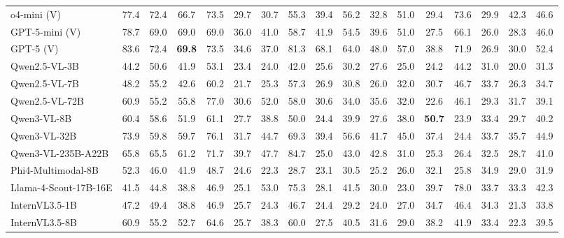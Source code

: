 \documentclass{article}
\theoremstyle{plain}
\theoremstyle{definition}
\theoremstyle{remark}
\theoremstyle{plain}
\begin{document}
\begin{table}[t]
{\begin{tabular}{l|cccc|ccccccc|cc|cc|c}
\midrule
\rowcolor{gray!20} \multicolumn{17}{c}{\textit{Visual Time Series as Input}} \\\midrule
\rowcolor{blue!10}
o4-mini (V) & 77.4 & 72.4 & 66.7 & 73.5 & 29.7 & 30.7 & 55.3 & 39.4 & 56.2 & 32.8 & 51.0 & 29.4 & 73.6 & 29.9 & 42.3 & 46.6 \\
\rowcolor{blue!10}
GPT-5-mini (V) & 78.7 & 69.0 & 69.0 & 69.0 & 36.0 & 41.0 & 58.7 & 41.9 & 54.5 & 39.6 & 51.0 & 27.5 & 66.1 & 26.0 & 28.3 & 46.0 \\
\rowcolor{blue!10}
GPT-5 (V) & 83.6 & 72.4 & \textbf{69.8} & 73.5 & 34.6 & 37.0 & 81.3 & 68.1 & 64.0 & 48.0 & 57.0 & 38.8 & 71.9 & 26.9 & 30.0 & 52.4 \\
\rowcolor{green!10}
Qwen2.5-VL-3B & 44.2 & 50.6 & 41.9 & 53.1 & 23.4 & 24.0 & 42.0 & 25.6 & 30.2 & 27.6 & 25.0 & 24.2 & 44.2 & 31.0 & 20.0 & 31.3 \\
\rowcolor{green!10}
Qwen2.5-VL-7B & 48.2 & 55.2 & 42.6 & 60.2 & 21.7 & 25.3 & 57.3 & 26.9 & 30.8 & 26.0 & 32.0 & 30.7 & 46.7 & 33.7 & 26.3 & 34.7 \\
\rowcolor{green!10}
Qwen2.5-VL-72B & 60.9 & 55.2 & 55.8 & 77.0 & 30.6 & 52.0 & 58.0 & 30.6 & 34.0 & 35.6 & 32.0 & 22.6 & 46.1 & 29.3 & 31.7 & 39.1 \\
\rowcolor{green!10}
Qwen3-VL-8B & 60.4 & 58.6 & 51.9 & 61.1 & 27.7 & 38.8 & 50.0 & 24.4 & 39.9 & 27.6 & 38.0 & \textbf{50.7} & 23.9 & 33.4 & 29.7 & 40.2 \\
\rowcolor{green!10}
Qwen3-VL-32B & 73.9 & 59.8 & 59.7 & 76.1 & 31.7 & 44.7 & 69.3 & 39.4 & 56.6 & 41.7 & 45.0 & 37.4 & 24.4 & 33.7 & 35.7 & 44.9 \\
\rowcolor{green!10}
Qwen3-VL-235B-A22B & 65.8 & 65.5 & 61.2 & 71.7 & 39.7 & 47.7 & 84.7 & 25.0 & 43.0 & 42.8 & 31.0 & 25.3 & 26.4 & 32.5 & 28.7 & 41.0 \\
\rowcolor{green!10}
Phi4-Multimodal-8B & 52.3 & 46.0 & 41.9 & 48.7 & 24.6 & 22.3 & 28.7 & 23.1 & 30.5 & 25.2 & 26.0 & 32.1 & 25.8 & 34.9 & 29.0 & 31.9 \\
\rowcolor{green!10}
Llama-4-Scout-17B-16E  & 41.5 & 44.8 & 38.8 & 46.9 & 25.1 & 53.0 & 75.3 & 28.1 & 41.5 & 30.0 & 23.0 & 39.7 & 78.0 & 33.7 & 33.3 & 42.3 \\
\rowcolor{green!10}
InternVL3.5-1B & 47.2 & 49.4 & 38.8 & 46.9 & 25.7 & 24.3 & 46.7 & 24.4 & 29.2 & 24.0 & 27.0 & 34.7 & 46.4 & 34.3 & 21.3 & 33.8 \\
\rowcolor{green!10}
InternVL3.5-8B & 60.9 & 55.2 & 52.7 & 64.6 & 25.7 & 38.3 & 60.0 & 27.5 & 40.5 & 31.6 & 29.0 & 38.2 & 41.9 & 33.4 & 22.3 & 39.5 \\

\end{tabular}}
\end{table}
\end{document}
